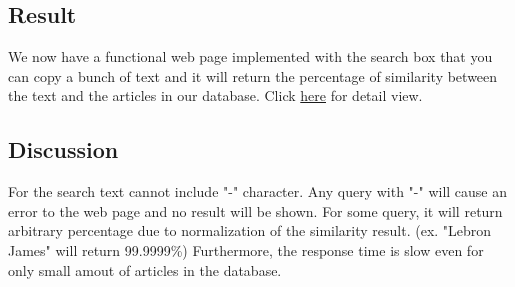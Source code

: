\subsection{Result}
We now have a functional web page implemented with the search box that you can copy a bunch of text and it will return the percentage of similarity between the text and the articles in our database. 
Click \href{http://django.nordlinglab.org}{here} for detail view.

\subsection{Discussion}
For the search text cannot include "-" character. Any query with "-" will cause an error to the web page and no result will be shown. For some query, it will return arbitrary percentage due to normalization of the similarity result. (ex. "Lebron James" will return 99.9999\%)
Furthermore, the response time is slow even for only small amout of articles in the database.